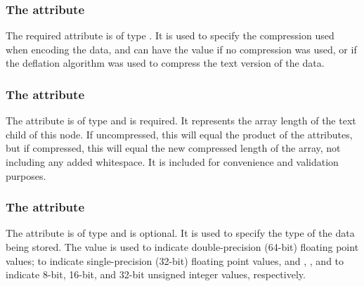 \subsubsection{The \fixttspace{} attribute}
The required  attribute is of type . It is used to specify the compression used when encoding the data, and can have the value  if no compression was used, or  if the deflation algorithm was used to compress the text version of the data.


\subsubsection{The \fixttspace{} attribute}
The  attribute is of type  and is required. It represents the array length of the  text child of this node.  If uncompressed, this will equal the product of the  attributes, but if compressed, this will equal the new compressed length of the array, not including any added whitespace.  It is included for convenience and validation purposes.

\subsubsection{The \fixttspace{} attribute}
The  attribute is of type  and is optional.  It is used to specify the type of the data being stored.  The value  is used to indicate double-precision (64-bit) floating point values;  to indicate single-precision (32-bit) floating point values, and , , and  to indicate 8-bit, 16-bit, and 32-bit unsigned integer values, respectively.

